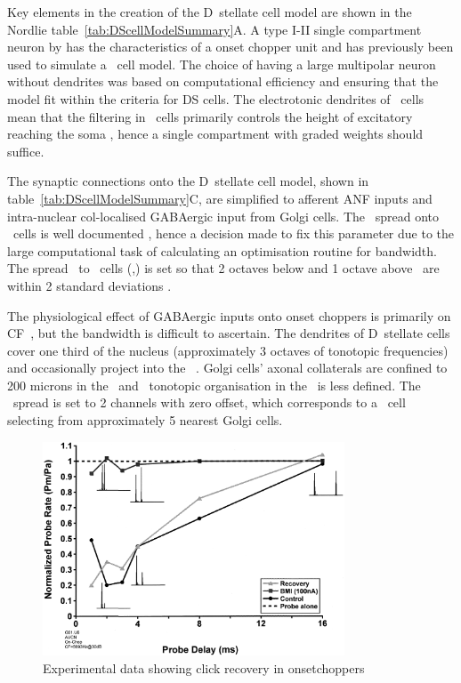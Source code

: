 Key elements in the creation of the D~stellate cell model are shown in the Nordlie table~\ref{tab:DScellModelSummary}A.
A type I-II single compartment neuron by \citet{RothmanManis:2003b} has the characteristics of a onset chopper unit and has previously been used to simulate a \DS~cell model.
The choice of having a large multipolar neuron without dendrites was based on computational efficiency and ensuring that the model fit within the criteria for DS cells.
The electrotonic dendrites of \DS~cells mean that the filtering in \DS~cells primarily controls the height of excitatory {\PSPs} reaching the soma \citep{WhiteYoungEtAl:1994}, hence a single compartment with graded weights should suffice.


The synaptic connections onto the D~stellate cell model, shown in table~\ref{tab:DScellModelSummary}C, are simplified to afferent ANF inputs and intra-nuclear col-localised GABAergic input from Golgi cells.
The \ANF~spread onto \DS~cells is well documented \citep{PaoliniClark:1999,ArnottWallaceEtAl:2004,PalmerWallaceEtAl:2003,JiangPalmerEtAl:1996,PalmerJiangEtAl:1996}, hence a decision made to fix this parameter due to the large computational task of calculating an optimisation routine for \ANFDS bandwidth.
The spread \ANF~to \DS~cells (\sANFDSh,\sANFDSl) is set so that 2 octaves below and 1 octave above \CF~are within 2 standard deviations \citep{PaoliniClark:1999}.


The physiological effect of GABAergic inputs onto onset choppers is primarily on CF~\citep{CasparyHaveyEtAl:1979,PalombiCaspary:1992,CasparyBackoffEtAl:1994,CasparyPalombi:1993,CasparyPalombiEtAl:1993}, but the bandwidth is difficult to ascertain.
The dendrites of D~stellate cells cover one third of the nucleus (approximately 3 octaves of tonotopic frequencies) and occasionally project into the \GCD~\citep{ArnottWallaceEtAl:2004}.
Golgi cells' axonal collaterals are confined to 200 microns in the \GCD~and \ANF~tonotopic organisation in the \GCD~is less defined.
The \GLGDS~spread is set to 2 channels with zero offset, which corresponds to a \DS~cell selecting from approximately 5 nearest Golgi cells.

\begin{figure}[htb]
  \centering
\includegraphics[keepaspectratio,width=0.8\textwidth]{gfx/Backoff+Palombi-Fig3}
\caption{Experimental data showing click recovery in onsetchoppers
\label{fig:BackoffPalombi}}
\end{figure}

